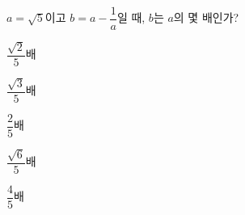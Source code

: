 $a=\sqrt{5}$이고 $b=a-\dfrac{1}{a}$일 때, $b$는 $a$의 몇 배인가?
\begin{choices32}{\rule[-3ex]{0pt}{8ex}$\dfrac{\sqrt{2}}{5}$배}{\rule[-3ex]{0pt}{8ex}$\dfrac{\sqrt{3}}{5}$배}{\rule[-3ex]{0pt}{8ex}$\dfrac{2}{5}$배}{\rule[-3ex]{0pt}{8ex}$\dfrac{\sqrt{6}}{5}$배}{\rule[-3ex]{0pt}{8ex}$\dfrac{4}{5}$배}\end{choices32}

